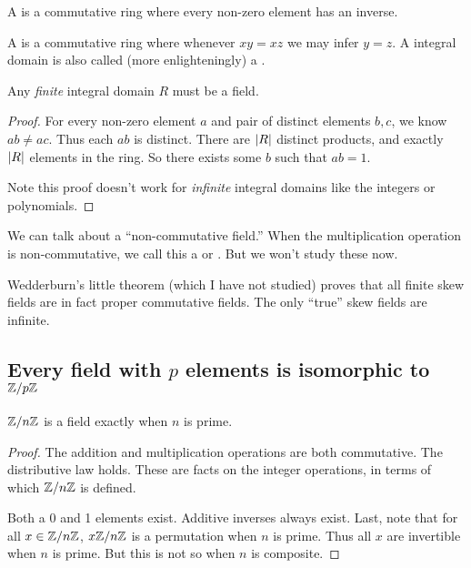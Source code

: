 \begin{definition}
  A  is a commutative ring where every non-zero element
  has an inverse.
\end{definition}

\begin{definition}
  A  is a commutative ring where whenever $xy =
  xz$ we may infer $y = z$. A integral domain is also called (more
  enlighteningly) a .
\end{definition}

\begin{proposition}
  Any \emph{finite} integral domain $R$ must be a field.
\end{proposition}

\begin{proof}
  For every non-zero element $a$ and pair of distinct elements $b, c$,
  we know $ab \ne ac$. Thus each $ab$ is distinct. There are $|R|$
  distinct products, and exactly $|R|$ elements in the ring. So
  there exists some $b$ such that $ab = 1$.

  Note this proof doesn't work for \emph{infinite} integral domains like
  the integers or polynomials.
\end{proof}

\begin{definition}
  We can talk about a ``non-commutative field.'' When the multiplication
  operation is non-commutative, we call this a  or
  . But we won't study these now.

  Wedderburn's little theorem (which I have not studied) proves that all
  finite skew fields are in fact proper commutative fields. The only
  ``true'' skew fields are infinite.
\end{definition}

\subsection{Every field with $p$ elements is isomorphic to $\mathbb{Z} / p\mathbb{Z}$}

\begin{theorem}
  $\mathbb{Z} / n\mathbb{Z}$ is a field exactly when $n$ is prime.
\end{theorem}

\begin{proof}
  The addition and multiplication operations are both commutative. The
  distributive law holds. These are facts on the integer operations, in
  terms of which $\mathbb{Z} / n\mathbb{Z}$ is defined.

  Both a 0 and 1 elements exist. Additive inverses always exist. Last,
  note that for all $x \in \mathbb{Z} / n\mathbb{Z}$, $x\mathbb{Z} / n\mathbb{Z}$ is a permutation when $n$
  is prime. Thus all $x$ are invertible when $n$ is prime. But this is
  not so when $n$ is composite.
\end{proof}

